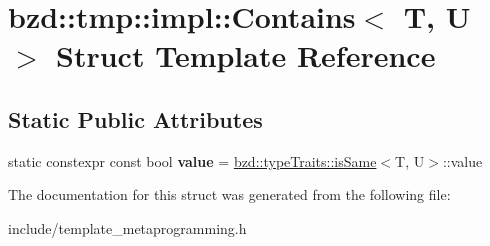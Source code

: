 \hypertarget{structbzd_1_1tmp_1_1impl_1_1Contains_3_01T_00_01U_01_4}{}\section{bzd\+:\+:tmp\+:\+:impl\+:\+:Contains$<$ T, U $>$ Struct Template Reference}
\label{structbzd_1_1tmp_1_1impl_1_1Contains_3_01T_00_01U_01_4}
\subsection*{Static Public Attributes}
\begin{DoxyCompactItemize}
\item 
\mbox{\label{structbzd_1_1tmp_1_1impl_1_1Contains_3_01T_00_01U_01_4_a8764ac95288cbf57aefb4b40a901b75a}} 
static constexpr const bool {\bfseries value} = \hyperlink{structbzd_1_1typeTraits_1_1isSame}{bzd\+::type\+Traits\+::is\+Same}$<$T, U$>$\+::value
\end{DoxyCompactItemize}


The documentation for this struct was generated from the following file\+:\begin{DoxyCompactItemize}
\item 
include/template\+\_\+metaprogramming.\+h\end{DoxyCompactItemize}
